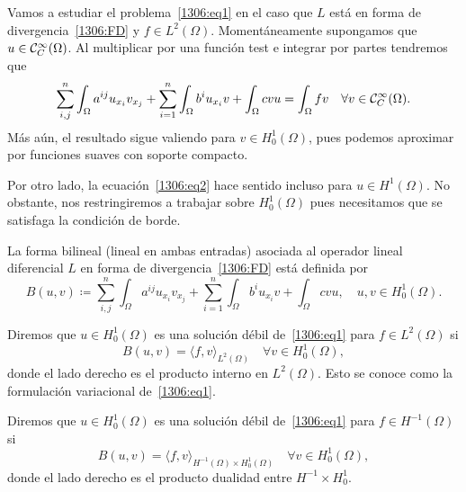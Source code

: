 \documentclass[../edp.tex]{subfiles}
\begin{document}
Vamos a estudiar el problema~\eqref{1306:eq1} en el caso que \(L\)
está en forma de divergencia~\eqref{1306:FD} y \(f\in L^{2}(\Omega)\).
Momentáneamente supongamos que \(u\in\mathcal{C}^{\infty}_{C}(\Omega)\). Al
multiplicar por una función test e integrar por partes tendremos que
\begin{equation}\label{1306:eq2}
	\sum_{i,j}^{n}
	\int_{\Omega} a^{ij} u_{x_i} v_{x_j}
	+
	\sum_{i=1}^{n}
	\int_{\Omega} b^{i} u_{x_i} v
	+
	\int_{\Omega} cvu
	=
	\int_{\Omega} fv
	\quad\forall v\in \mathcal{C}^{\infty}_{C}(\Omega).
\end{equation} 
Más aún, el resultado sigue valiendo para \(v\in H^{1}_{0}(\Omega)\),
pues podemos aproximar por funciones suaves con soporte compacto.

Por otro lado, la ecuación~\eqref{1306:eq2} hace sentido incluso para
\(u\in H^{1}(\Omega)\). No obstante, nos restringiremos a trabajar
sobre \(H^{1}_{0}(\Omega)\) pues necesitamos que se satisfaga la
condición de borde.

\begin{Definicion}
	La forma bilineal (lineal en ambas entradas) asociada al operador
	lineal diferencial \(L\) en forma de divergencia~\eqref{1306:FD} 
	está definida por
	\begin{displaymath}\label{1306:starB}
		B(u,v) 
		\coloneqq
		\sum_{i,j}^{n}
		\int_{\Omega} a^{ij} u_{x_i} v_{x_j}
		+
		\sum_{i=1}^{n}
		\int_{\Omega} b^{i} u_{x_i} v
		+
		\int_{\Omega} cvu,
		\quad u,v \in H^{1}_{0}(\Omega).
		\tag{\(\star_B\)}
	\end{displaymath}
\end{Definicion}

\begin{Definicion}
	Diremos que \(u\in H^{1}_{0}(\Omega)\) es una solución débil
	de~\eqref{1306:eq1} para \(f\in L^{2}(\Omega)\) si 
	\begin{displaymath}
		B(u,v) = \langle f,v \rangle_{L^{2}(\Omega)}
		\quad\forall v \in H^{1}_{0}(\Omega),
	\end{displaymath}
	donde el lado derecho es el producto interno en \(L^{2}(\Omega)\).
	Esto se conoce como la formulación variacional
	de~\eqref{1306:eq1}.
\end{Definicion}

\begin{Definicion}
	Diremos que \(u\in H^{1}_{0}(\Omega)\) es una solución débil
	de~\eqref{1306:eq1} para \(f\in H^{-1}(\Omega)\) si 
	\begin{displaymath}
		B(u,v) = 
		\langle f,v \rangle_{H^{-1}(\Omega)\times H^{1}_{0}(\Omega)}
		\quad\forall v \in H^{1}_{0}(\Omega),
	\end{displaymath}
	donde el lado derecho es el producto dualidad entre \(H^{-1}\times
	H^{1}_{0}\).
\end{Definicion}
\end{document}
